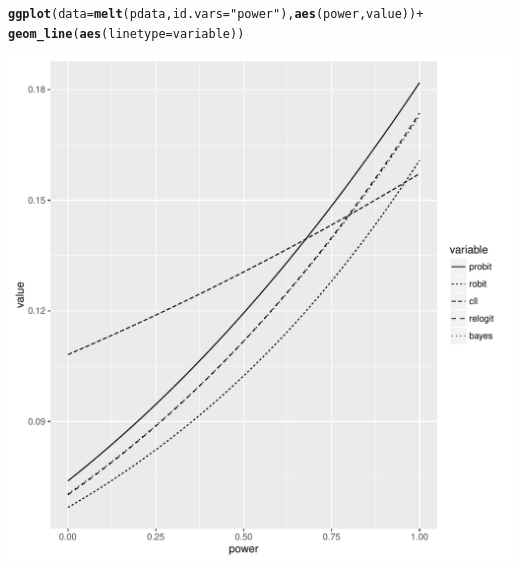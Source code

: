 \documentclass{article}\usepackage[]{graphicx}\usepackage[]{color}
\makeatletter
\def\maxwidth{ %
  \ifdim\Gin@nat@width>\linewidth
    \linewidth
  \else
    \Gin@nat@width
  \fi
}
\newcommand{\hlstr}[1]{\textcolor[rgb]{0.192,0.494,0.8}{#1}}%
\newcommand{\hlopt}[1]{\textcolor[rgb]{0,0,0}{#1}}%
\newcommand{\hlstd}[1]{\textcolor[rgb]{0.345,0.345,0.345}{#1}}%
\newcommand{\hlkwc}[1]{\textcolor[rgb]{0.333,0.667,0.333}{#1}}%
\newcommand{\hlkwd}[1]{\textcolor[rgb]{0.737,0.353,0.396}{\textbf{#1}}}%
\newenvironment{kframe}{%
 \def\at@end@of@kframe{}%
 \ifinner\ifhmode%
  \def\at@end@of@kframe{\end{minipage}}%
  \begin{minipage}{\columnwidth}%
 \fi\fi%
 \def\FrameCommand##1{\hskip\@totalleftmargin \hskip-\fboxsep
 \colorbox{shadecolor}{##1}\hskip-\fboxsep
     \hskip-\linewidth \hskip-\@totalleftmargin \hskip\columnwidth}%
 \MakeFramed {\advance\hsize-\width
   \@totalleftmargin\z@ \linewidth\hsize
   \@setminipage}}%
 {\par\unskip\endMakeFramed%
 \at@end@of@kframe}
\newenvironment{knitrout}{}{} %
\makeatother
\begin{document}
\begin{knitrout}
\begin{kframe}
\begin{alltt}
\hlkwd{ggplot}\hlstd{(}\hlkwc{data} \hlstd{=} \hlkwd{melt}\hlstd{(pdata,} \hlkwc{id.vars} \hlstd{=} \hlstr{"power"}\hlstd{),} \hlkwd{aes}\hlstd{(power, value))} \hlopt{+}
  \hlkwd{geom_line}\hlstd{(}\hlkwd{aes}\hlstd{(}\hlkwc{linetype} \hlstd{= variable))}
\end{alltt}
\end{kframe}
\includegraphics[width=\maxwidth]{figure/unnamed-chunk-9-1} 

\end{knitrout}
\end{document}
